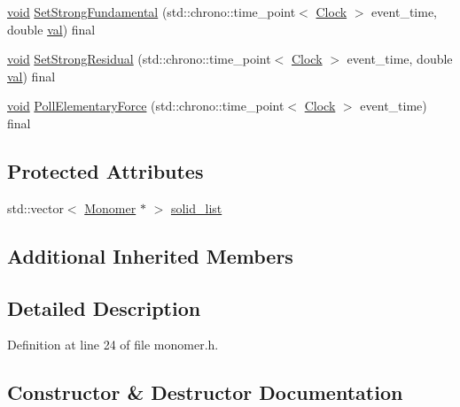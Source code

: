 \begin{DoxyCompactItemize}
\item 
\mbox{\hyperlink{glad_8h_a950fc91edb4504f62f1c577bf4727c29}{void}} \mbox{\hyperlink{class_monomer_ad9df06c1a8264bfdb514ef3ba04ef4c7}{Set\+Strong\+Fundamental}} (std\+::chrono\+::time\+\_\+point$<$ \mbox{\hyperlink{universe_8h_a0ef8d951d1ca5ab3cfaf7ab4c7a6fd80}{Clock}} $>$ event\+\_\+time, double \mbox{\hyperlink{glad_8h_a26942fd2ed566ef553eae82d2c109c8f}{val}}) final
\item 
\mbox{\hyperlink{glad_8h_a950fc91edb4504f62f1c577bf4727c29}{void}} \mbox{\hyperlink{class_monomer_ae6ca57913da27fa749d33d1c4fed27ca}{Set\+Strong\+Residual}} (std\+::chrono\+::time\+\_\+point$<$ \mbox{\hyperlink{universe_8h_a0ef8d951d1ca5ab3cfaf7ab4c7a6fd80}{Clock}} $>$ event\+\_\+time, double \mbox{\hyperlink{glad_8h_a26942fd2ed566ef553eae82d2c109c8f}{val}}) final
\item 
\mbox{\hyperlink{glad_8h_a950fc91edb4504f62f1c577bf4727c29}{void}} \mbox{\hyperlink{class_monomer_a5b2375df1e19abdf6045c475d2ac23ca}{Poll\+Elementary\+Force}} (std\+::chrono\+::time\+\_\+point$<$ \mbox{\hyperlink{universe_8h_a0ef8d951d1ca5ab3cfaf7ab4c7a6fd80}{Clock}} $>$ event\+\_\+time) final
\end{DoxyCompactItemize}
\subsection*{Protected Attributes}
\begin{DoxyCompactItemize}
\item 
std\+::vector$<$ \mbox{\hyperlink{class_monomer}{Monomer}} $\ast$ $>$ \mbox{\hyperlink{class_monomer_ad792aeb859c72edbb17414bf00b8fd12}{solid\+\_\+list}}
\end{DoxyCompactItemize}
\subsection*{Additional Inherited Members}


\subsection{Detailed Description}


Definition at line 24 of file monomer.\+h.



\subsection{Constructor \& Destructor Documentation}
\mbox{\label{class_monomer_a2b1f69caca47d8597e43300ae7076095}} 
